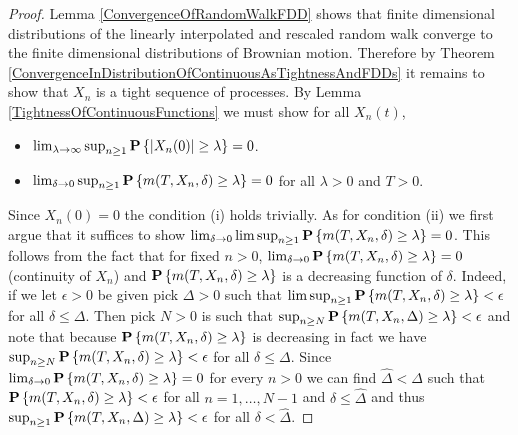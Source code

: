 \begin{proof}
Lemma \ref{ConvergenceOfRandomWalkFDD} shows that finite dimensional
distributions of the linearly interpolated and rescaled random walk
converge to the finite dimensional distributions of Brownian motion.
Therefore by Theorem
\ref{ConvergenceInDistributionOfContinuousAsTightnessAndFDDs} it
remains to show that $X_n$ is a tight sequence of processes.
By Lemma \ref{TightnessOfContinuousFunctions} we must show for all $X_n(t)$,
\begin{itemize}
\item[(i)]$\lim_{\lambda \to \infty} \sup_{n \geq 1} \textbf{P}\left \{\left \vert X_n(0) \right \vert
  \geq \lambda \right \}= 0$.
\item[(ii)] $\lim_{\delta \to 0} \sup_{n \geq 1} \textbf{P}\left \{m(T, X_n,
  \delta) \geq \lambda \right \} = 0$ for all $\lambda > 0$ and $T > 0$.
\end{itemize}
Since $X_n(0) = 0$ the condition (i) holds trivially.  As for
condition (ii) we first argue that it suffices to show $\lim_{\delta \to 0} \limsup_{n \geq 1} \textbf{P}\left \{m(T, X_n,
  \delta) \geq \lambda \right \}= 0$.  This follows from the fact that for
fixed $n > 0$,
$\lim_{\delta \to 0} \textbf{P}\left \{m(T, X_n,  \delta) \geq \lambda \right \} =
0$ (continuity of $X_n$) and $\textbf{P}\left \{m(T, X_n,  \delta) \geq \lambda \right \}$ is a decreasing
function of $\delta$.  Indeed, if we let $\epsilon > 0$ be given pick
$\Delta > 0$ such that $\limsup_{n \geq 1} \textbf{P}\left \{m(T, X_n,
  \delta) \geq \lambda \right \} < \epsilon$ for all $\delta \leq \Delta$.  Then pick $N > 0$ is such that $\sup_{n \geq N} \textbf{P}\left \{m(T, X_n,
  \Delta) \geq \lambda \right \} < \epsilon$ and note that because $\textbf{P}\left \{m(T, X_n,
  \delta) \geq \lambda \right \}$ is decreasing in fact we have $\sup_{n \geq N} \textbf{P}\left \{m(T, X_n,
  \delta) \geq \lambda \right \} < \epsilon$ for all $\delta \leq \Delta$.
Since $\lim_{\delta \to 0} \textbf{P}\left \{m(T, X_n,
  \delta) \geq \lambda \right \} = 0 $ for every $n>0$ we can find
$\hat{\Delta} < \Delta$ such that $\textbf{P}\left \{m(T, X_n,
  \delta) \geq \lambda \right \}  < \epsilon$ for all $n=1, \dotsc, N-1$ and
$\delta \leq \hat{\Delta}$ and
thus $\sup_{n \geq 1} \textbf{P}\left \{m(T, X_n,  \Delta) \geq \lambda \right \} < \epsilon$ for all $\delta < \hat{\Delta}$.


\end{proof}
